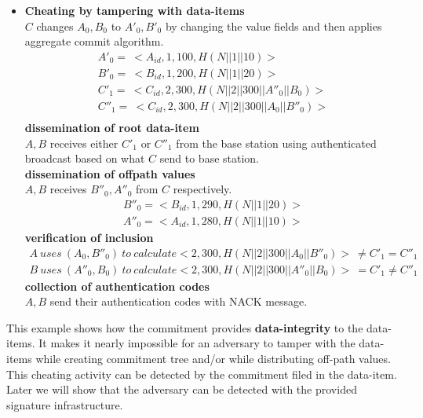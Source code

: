 \begin{exmp}
\begin{itemize}
	\item \textbf{Cheating by tampering with data-items}\\
		$C$ changes $A_{0},B_{0}$ to $A'_{0},B'_{0}$ by changing the value fields and then applies aggregate commit algorithm.\\
		\begin{equation}
			\begin{array}{l}
				A'_{0} =\ <A_{id},1,100, H(N||1||10)>\\
				B'_{0} =\ <B_{id},1,200, H(N||1||20)>\\
				C'_{1} =\ <C_{id},2,300, H(N||2||300||A''_{0}||B_{0})>\\
				C''_{1} =\ <C_{id},2,300, H(N||2||300||A_{0}||B''_{0})>\\
			\end{array}
		\end{equation}
		\textbf{dissemination of root data-item}\\
		$A,B$ receives either $C'_{1}$ or $C''_{1}$ from the base station using authenticated broadcast based on what $C$ send to base station.\\
		\textbf{dissemination of offpath values}\\
		$A,B$ receives $B''_{0},A''_{0}$ from $C$ respectively.
		\begin{equation}
			\begin{array}{l}
				B''_{0} = <B_{id},1,290,H(N||1||20)>\\
				A''_{0} = <A_{id},1,280,H(N||1||10)>
			\end{array}
		\end{equation}
		\textbf{verification of inclusion}
		\begin{equation}
			\begin{array}{l}
				A\ uses\ (A_{0}, B''_{0})\ to\ calculate <2,300,H(N||2||300||A_{0}||B''_{0})>\  \neq C'_{1} = C''_{1}\\
				B\ uses\ (A''_{0}, B_{0})\ to\ calculate <2,300,H(N||2||300||A''_{0}||B_{0})>\  = C'_{1} \neq C''_{1}
			\end{array}
		\end{equation}
		\textbf{collection of authentication codes}\\
			$A,B$ send their authentication codes with NACK message.\\
	\end{itemize}
	\end{exmp}
	This example shows how the commitment provides \textbf{data-integrity} to the data-items.
	It makes it nearly impossible for an adversary to tamper with the data-items while creating commitment tree and/or while distributing off-path values.
	This cheating activity can be detected by the commitment filed in the data-item.
	Later we will show that the adversary can be detected with the provided signature infrastructure.
	
